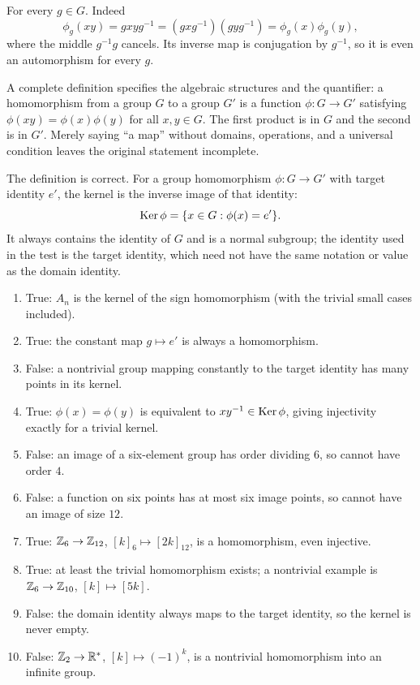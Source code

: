 For every $g\in G$. Indeed
\[\phi_g(xy)=gxyg^{-1}=(gxg^{-1})(gyg^{-1})=\phi_g(x)\phi_g(y),\]
where the middle $g^{-1}g$ cancels. Its inverse map is conjugation by $g^{-1}$, so it is even an automorphism for every $g$.

A complete definition specifies the algebraic structures and the quantifier: a homomorphism from a group $G$ to a group $G'$ is a function $\phi:G\to G'$ satisfying $\phi(xy)=\phi(x)\phi(y)$ for all $x,y\in G$. The first product is in $G$ and the second is in $G'$. Merely saying ``a map'' without domains, operations, and a universal condition leaves the original statement incomplete.

The definition is correct. For a group homomorphism $\phi:G\to G'$ with target identity $e'$, the kernel is the inverse image of that identity:
\[\operatorname{Ker}\phi=\{x\in G:\phi(x)=e'\}.\]
It always contains the identity of $G$ and is a normal subgroup; the identity used in the test is the target identity, which need not have the same notation or value as the domain identity.

\begin{enumerate}[label=(\alph*)]
\item True: $A_n$ is the kernel of the sign homomorphism (with the trivial small cases included).
\item True: the constant map $g\mapsto e'$ is always a homomorphism.
\item False: a nontrivial group mapping constantly to the target identity has many points in its kernel.
\item True: $\phi(x)=\phi(y)$ is equivalent to $xy^{-1}\in\operatorname{Ker}\phi$, giving injectivity exactly for a trivial kernel.
\item False: an image of a six-element group has order dividing $6$, so cannot have order $4$.
\item False: a function on six points has at most six image points, so cannot have an image of size $12$.
\item True: $\mathbb{Z}_6\to\mathbb{Z}_{12}$, $[k]_6\mapsto[2k]_{12}$, is a homomorphism, even injective.
\item True: at least the trivial homomorphism exists; a nontrivial example is $\mathbb{Z}_6\to\mathbb{Z}_{10}$, $[k]\mapsto[5k]$.
\item False: the domain identity always maps to the target identity, so the kernel is never empty.
\item False: $\mathbb{Z}_2\to\mathbb{R}^*$, $[k]\mapsto(-1)^k$, is a nontrivial homomorphism into an infinite group.
\end{enumerate}

